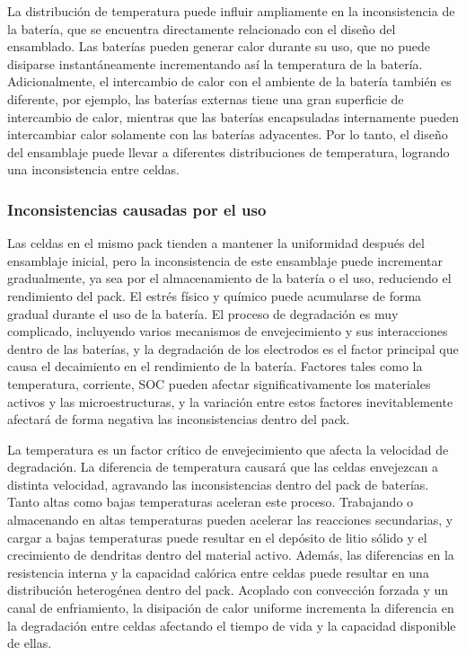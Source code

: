 La distribuci\'on de temperatura puede influir ampliamente en la inconsistencia
de la bater\'ia, que se encuentra directamente relacionado con el diseño del
ensamblado. Las bater\'ias pueden generar calor durante su uso, que no puede
disiparse instant\'aneamente incrementando as\'i la temperatura de la bater\'ia.
Adicionalmente, el intercambio de calor con el ambiente de la bater\'ia
tambi\'en es diferente, por ejemplo, las bater\'ias externas tiene una gran
superficie de intercambio de calor, mientras que las bater\'ias encapsuladas
internamente pueden intercambiar calor solamente con las bater\'ias adyacentes.
Por lo tanto, el diseño del ensamblaje puede llevar a diferentes distribuciones
de temperatura, logrando una inconsistencia entre celdas.

\subsubsection{Inconsistencias causadas por el uso}

Las celdas en el mismo pack tienden a mantener la uniformidad despu\'es del
ensamblaje inicial, pero la inconsistencia de este ensamblaje puede incrementar
gradualmente, ya sea por el almacenamiento de la bater\'ia o el uso, reduciendo
el rendimiento del pack. El estr\'es f\'isico y qu\'imico puede acumularse
de forma gradual durante el uso de la bater\'ia. El proceso de degradaci\'on es
muy complicado, incluyendo varios mecanismos de envejecimiento y sus
interacciones dentro de las bater\'ias, y la degradaci\'on de los electrodos es
el factor principal que causa el decaimiento en el rendimiento de la bater\'ia.
Factores tales como la temperatura, corriente, \acrshort{SOC} pueden afectar
significativamente los materiales activos y las microestructuras, y la
variaci\'on entre estos factores inevitablemente afectar\'a de forma negativa
las inconsistencias dentro del pack.

La temperatura es un factor cr\'itico de envejecimiento que afecta la velocidad
de degradaci\'on. La diferencia de temperatura causar\'a que las celdas
envejezcan a distinta velocidad, agravando las inconsistencias dentro del pack
de bater\'ias. Tanto altas como bajas temperaturas aceleran este proceso.
Trabajando o almacenando en altas temperaturas pueden acelerar las reacciones
secundarias, y cargar a bajas temperaturas puede resultar en el dep\'osito de
litio s\'olido y el crecimiento de dendritas dentro del material activo.
Adem\'as, las diferencias en la resistencia interna y la capacidad cal\'orica
entre celdas puede resultar en una distribuci\'on heterog\'enea dentro del pack.
Acoplado con convecci\'on forzada y un canal de enfriamiento, la disipaci\'on de
calor uniforme incrementa la diferencia en la degradaci\'on entre celdas
afectando el tiempo de vida y la capacidad disponible de ellas. 

